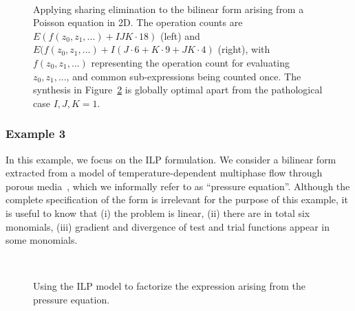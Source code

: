 \begin{figure}[h]
\begin{CenteredBox}
\begin{subfigure}{0.40\textwidth}

\label{code:poisson_a}
\end{subfigure}
~~~~~~~~~~
\begin{subfigure}{0.40\textwidth}

\label{code:poisson_b}
\end{subfigure}

\end{CenteredBox}
\caption{Applying sharing elimination to the bilinear form arising from a Poisson equation in 2D. The operation counts are $E(f(z_0, z_1, ...) + IJK \cdot 18)$ (left) and $E(f(z_0, z_1, ...) + I(J \cdot 6 + K \cdot 9 + JK \cdot 4)$ (right), with $f(z_0, z_1, ...)$ representing the operation count for evaluating $z_0, z_1, ...$, and common sub-expressions being counted once. The synthesis in Figure~\ref{code:poisson_b} is globally optimal apart from the pathological case  $I, J, K = 1$.}
\label{code:poisson}
\end{figure}

\subsubsection{Example 3}
In this example, we focus on the ILP formulation. We consider a bilinear form extracted from a model of temperature-dependent multiphase flow through porous media~\citep{quadrature-olegaard}, which we informally refer to as ``pressure equation''. Although the complete specification of the form is irrelevant for the purpose of this example, it is useful to know that (i) the problem is linear, (ii) there are in total six monomials, (iii) gradient and divergence of test and trial functions appear in some monomials. 

\begin{figure}[htp]

\begin{subfigure}{\textwidth}

\label{code:pressure_a}
\end{subfigure}
~\\
\begin{subfigure}{\textwidth}

\label{code:pressure_b}
\end{subfigure}

\caption{Using the ILP model to factorize the expression arising from the pressure equation.}
\label{code:pressure}
\end{figure}

